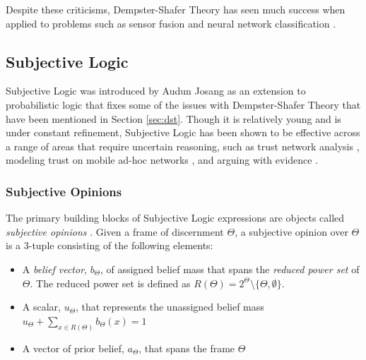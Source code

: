 \documentclass[thesis.tex]{subfiles}
\begin{document}
Despite these criticisms, Dempster-Shafer Theory has seen much success when applied to
problems such as sensor fusion \cite{wu2002sensor, murphy1998dempster, basir2007engine} and
neural network classification \cite{denoeux2000neural, rogova1994combining}.




\subsection{Subjective Logic}
\label{sec:subjective-logic-intro}

Subjective Logic was introduced by Audun Josang \cite{josang2001logic} as an
extension to probabilistic logic that fixes some of the issues with
Dempster-Shafer Theory \cite{josang2012dempster} that have been mentioned in Section \ref{sec:dst}.
Though it is relatively young and is under constant refinement,
Subjective Logic has been shown to be effective
across a range of areas that require uncertain reasoning, such as
trust network analysis \cite{josang2006trust, josang2008optimal},
modeling trust on mobile ad-hoc networks \cite{li2004trust, liu2011novel},
and arguing with evidence \cite{oren2007subjective, josang2000legal}.






\subsubsection{Subjective Opinions}

The primary building blocks of Subjective Logic expressions are
objects called \emph{subjective opinions} \cite{josang2001logic}. Given a frame of discernment $\Theta$, a subjective
opinion over $\Theta$ is a 3-tuple consisting of the following elements:

\begin{itemize}
  \item A \emph{belief vector}, $b_\Theta$, of assigned belief mass that spans the \emph{reduced power set}
    of $\Theta$. The reduced power set is defined as $R \left(\Theta\right) = 2^\Theta \setminus \lbrace \Theta, \emptyset \rbrace$.
  \item A scalar, $u_\Theta$, that represents the unassigned belief mass
    $u_\Theta + \sum_{x \in R\left(\Theta\right)} b_\Theta\left(x\right) = 1$
  \item A vector of prior belief, $a_\Theta$, that spans the frame $\Theta$
\end{itemize}
\end{document}
